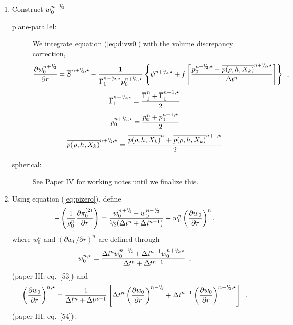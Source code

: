 \begin{description}
\begin{enumerate}
\item Construct $w_0^{\nph}$

\begin{description}

\item[plane-parallel:] We integrate equation (\ref{eq:divw0}) with the 
volume discrepancy correction,
\begin{equation}
\frac{\partial w_0^{\nph}}{\partial r} = 
\overline{S}^{\nph,\star} - \frac{1}{\gammabar^{\nph,\star} p_0^{\nph,\star}}
\left\{ \psi^{\nph,\star} + f \left[\frac{p_0^{\nph,\star} - \overline{p(\rho,h,X_k)}^{\nph,\star}}{\Delta t^n}\right]\right\}
\enskip ,
\end{equation}
\begin{equation}
\gammabar^{\nph,\star} = \frac{\gammabar^{n} + \gammabar^{n+1,\star}}{2}
\end{equation}
\begin{equation}
p_0^{\nph,\star} = \frac{p_0^{n} + p_0^{n+1,\star}}{2}
\end{equation}
\begin{equation}
\overline{p(\rho,h,X_k)}^{\nph,\star} = 
\frac{\overline{p(\rho,h,X_k)}^n + \overline{p(\rho,h,X_k)}^{n+1,\star}}{2}
\end{equation}

\item[spherical:] See Paper IV for working notes until we finalize this.

\end{description}



\item Using equation (\ref{eq:pizero}), define
\begin{equation}
-\left ( \frac{1}{\rho_0^n} \frac{\partial \pizerotwo}{\partial r} \right ) = 
\frac{w_0^{\nph} - w_0^\nmh}{\myhalf(\dt^n+\dt^{n-1})} 
+ w_0^n \left(\frac{\partial w_0}{\partial r}\right)^n.
\end{equation}
where $w_0^n$ and $(\partial w_0 / \partial r)^{n}$ are defined through
\begin{equation}
w_0^{n,\star} = \frac{\dt^{n} w_0^{\nmh} + \dt^{n-1} w_0^{\nph,\star}}{\dt^n+\dt^{n-1}}\enskip,\label{eq:w0nstar}
\end{equation}
(paper III; eq.~[53]) and
\begin{equation}
\left(\frac{\partial w_0}{\partial r}\right)^{n,\star} = \frac{1}{\dt^n+\dt^{n-1} } \left [ \dt^{n} \left(\frac{\partial w_0 }{ \partial r}\right)^{\nmh}
+ \dt^{n-1} \left(\frac{\partial w_0 }{ \partial r}\right)^{\nph,\star} \right ] \enskip.\label{eq:dw0drnstar}
\end{equation}
(paper III; eq.~[54]).


\end{enumerate}
\end{description}
